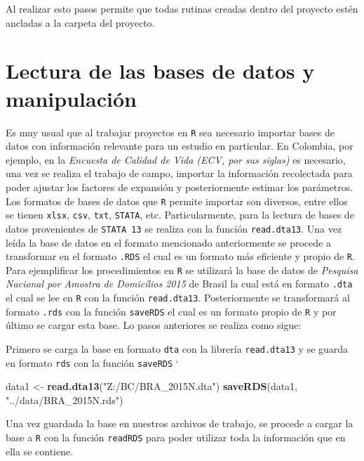 \documentclass[
  spanish,
  12pt,
]{book}
\newenvironment{Shaded}{\begin{snugshade}}{\end{snugshade}}
\newcommand{\FunctionTok}[1]{\textcolor[rgb]{0.13,0.29,0.53}{\textbf{#1}}}
\newcommand{\NormalTok}[1]{#1}
\newcommand{\OtherTok}[1]{\textcolor[rgb]{0.56,0.35,0.01}{#1}}
\newcommand{\StringTok}[1]{\textcolor[rgb]{0.31,0.60,0.02}{#1}}
\begin{document}
Al realizar esto pasos permite que todas rutinas creadas dentro del proyecto estén ancladas a la carpeta del proyecto.

\section{Lectura de las bases de datos y manipulación}\label{lectura-de-las-bases-de-datos-y-manipulaciuxf3n}

Es muy usual que al trabajar proyectos en \texttt{R} sea necesario importar bases de datos con información relevante para un estudio en particular. En Colombia, por ejemplo, en la \emph{Encuesta de Calidad de Vida (ECV, por sus siglas)} es necesario, una vez se realiza el trabajo de campo, importar la información recolectada para poder ajustar los factores de expansión y posteriormente estimar los parámetros. Los formatos de bases de datos que \texttt{R} permite importar son diversos, entre ellos se tienen \texttt{xlsx}, \texttt{csv}, \texttt{txt}, \texttt{STATA}, etc. Particularmente, para la lectura de bases de datos provenientes de \texttt{STATA\ 13} se realiza con la función \texttt{read.dta13}. Una vez leída la base de datos en el formato mencionado anteriormente se procede a transformar en el formato \texttt{.RDS} el cual es un formato más eficiente y propio de \texttt{R}. Para ejemplificar los procedimientos en \texttt{R} se utilizará la base de datos de \emph{Pesquisa Nacional por Amostra de Domicílios 2015 } de Brasil la cual está en formato \texttt{.dta} el cual se lee en \texttt{R} con la función \texttt{read.dta13}. Posteriormente se transformará al formato \texttt{.rds} con la función \texttt{saveRDS} el cual es un formato propio de \texttt{R} y por último se cargar esta base. Lo pasos anteriores se realiza como sigue:

Primero se carga la base en formato \texttt{dta} con la librería \texttt{read.dta13} y se guarda en formato \texttt{rds} con la función \texttt{saveRDS}
`

\begin{Shaded}
\begin{Highlighting}[]
\NormalTok{data1 }\OtherTok{\textless{}{-}} \FunctionTok{read.dta13}\NormalTok{(}\StringTok{"Z:/BC/BRA\_2015N.dta"}\NormalTok{)}
\FunctionTok{saveRDS}\NormalTok{(data1, }\StringTok{"../data/BRA\_2015N.rds"}\NormalTok{) }
\end{Highlighting}
\end{Shaded}

Una vez guardada la base en nuestros archivos de trabajo, se procede a cargar la base a \texttt{R} con la función \texttt{readRDS} para poder utilizar toda la información que en ella se contiene.
\end{document}
